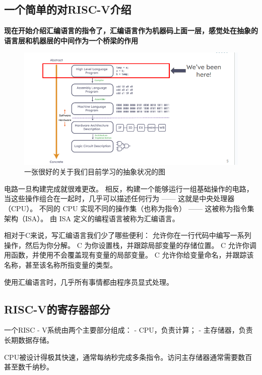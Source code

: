 \documentclass{ctexart}
\begin{document}
\subsection{一个简单的对RISC-V介绍}
\textbf{现在开始介绍汇编语言的指令了，汇编语言作为机器码上面一层，感觉处在抽象的语言层和机器层的中间作为一个桥梁的作用}
\begin{figure}
    \centering
    \includegraphics[width=0.5\linewidth]{目前的抽象.png}
    \caption{一张很好的关于我们目前学习的抽象状况的图}
    \label{fig:enter-label}
\end{figure}
电路一旦构建完成就很难更改。
相反，构建一个能够运行一组基础操作的电路，当这些操作组合在一起时，几乎可以描述任何行为 —— 这就是中央处理器（CPU）。
不同的 CPU 实现不同的操作集（也称为指令） —— 这被称为指令集架构（ISA）。
由 ISA 定义的编程语言被称为汇编语言。\par
相对于C来说，写汇编语言我们少了哪些便利： 允许你在一行代码中编写一系列操作，然后为你分解。
C 为你设置栈，并跟踪局部变量的存储位置。
C 允许你调用函数，并使用不会覆盖现有变量的局部变量。
C 允许你给变量命名，并跟踪该名称，甚至该名称所指变量的类型。\par
使用汇编语言时，几乎所有事情都由程序员显式处理。
\subsection{RISC-V的寄存器部分}




一个RISC - V系统由两个主要部分组成：  
- CPU，负责计算；  
- 主存储器，负责长期数据存储。  \par

CPU被设计得极其快速，通常每纳秒完成多条指令。访问主存储器通常需要数百甚至数千纳秒。  \par
\end{document}
